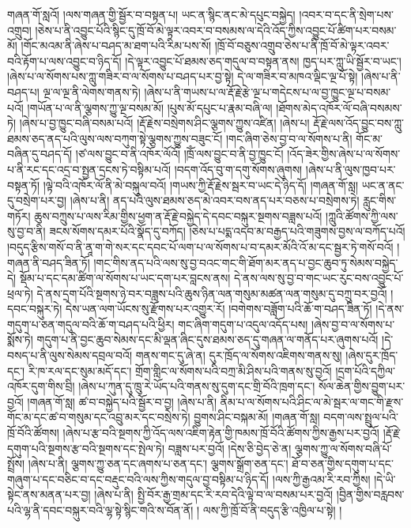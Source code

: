 གཞན་གོ་སླའོ། །ལས་གཞན་གྱི་སྦྱོར་བ་བསྟན་པ། ཡང་ན་སྙིང་ནང་མེ་དཔུང་བསྐྱེད། །འབར་བ་དང་ནི་སྲེག་པས་འགྲུབ། །ཅེས་པ་ནི་འབྱུང་པོའི་སྙིང་དུ་ཁྲོ་བོ་མེ་ལྟར་འབར་བ་བསམས་ལ་དེའི་འོད་ཀྱིས་འབྱུང་པོ་ཚིག་པར་བསམ་མོ། །གོང་མའམ་ནི་ཞེས་པ་བཤད་མ་ཐག་པའི་རིམ་པས་སོ། །ཁྲོ་བོ་བཅུས་འགྲུབ་ཅེས་པ་ནི་ཁྲོ་བོ་མེ་ལྟར་འབར་བའི་རྟོག་པ་ལས་འབྱུང་བ་ཉིད་དོ། །དེ་ལྟར་འབྱུང་པོ་ཐམས་ཅད་གདུལ་བ་བསྟན་ནས། ཁྱད་པར་ཀླུ་ཡི་སྦྱོར་བ་ཡང་། །ཞེས་པ་ལ་སོགས་པས་ཀླུ་གཟིར་བ་ལ་སོགས་པ་བཤད་པར་བྱ་སྟེ། དེ་ལ་གཟིར་བ་མཁའ་ལྡིང་ལྔ་པོ་སྟེ། །ཞེས་པ་ནི་བཤད་པ། ལྔ་ལ་ལྔ་ནི་ལེགས་གནས་ཏེ། །ཞེས་པ་ནི་གཡས་པ་ལ་རྡོ་རྗེ་རྩེ་ལྔ་པ་གདེངས་པ་ལ་བྱ་ཁྱུང་ལྔ་པ་བསམ་པའོ། །གཡོན་པ་ལ་ནི་ལྕགས་ཀྱུ་ལྔ་བསམ་མོ། །པུས་མོ་དཔུང་པ་རྣམ་བཞི་ལ། །ཐོགས་མེད་འཁོར་ལོ་བཞི་བསམས་ཏེ། །ཞེས་པ་བྱ་ཁྱུང་བཞི་བསམ་པའོ། །རྡོ་རྗེས་བསྲེགས་ཤིང་ལྕགས་ཀྱུས་འཛིན། །ཞེས་པ། རྡོ་རྗེ་ལས་འོད་བྱུང་བས་ཀླུ་ཐམས་ཅད་ནད་པའི་ལུས་ལས་བཀུག་སྟེ་ལྕགས་ཀྱུས་བཟུང་ངོ། །གང་ཞིག་ཅེས་བྱ་བ་ལ་སོགས་པ་ནི། གོང་མ་བཞིན་དུ་བཤད་དོ། །ཙ་ལས་བྱུང་བ་ནི་འཁོར་ལོའོ། །ཁྲོཾ་ལས་བྱུང་བ་ནི་བྱ་ཁྱུང་ངོ། །འོད་ཟེར་གྱིས་ཞེས་པ་ལ་སོགས་པ་ནི་རང་དང་འདྲ་བ་སྤྱན་དྲངས་ཏེ་བསྟིམ་པའོ། །བདག་འོད་བུ་ག་དགུ་སོགས་ཞུགས། །ཞེས་པ་ནི་ལུས་ཁྱབ་པར་བསྟན་ཏོ། །ལྟེ་བའི་འཁོར་ལོ་ནི་མེ་བསྐུལ་བའོ། །གཡས་ཀྱི་རྡོ་རྗེས་སྦར་བ་ཡང་དེ་ཉིད་དོ། །གཞན་གོ་སླ། ཡང་ན་ནང་དུ་བསྲེག་པར་བྱ། །ཞེས་པ་ནི། ནད་པའི་ལུས་ཐམས་ཅད་མེ་འབར་བས་ནད་པར་བཅས་པ་བསྲེགས་ཏེ། རླུང་གིས་གཏོར། ཆུས་བཀྲུས་པ་ལས་རིམ་གྱིས་ཕྱག་ན་རྡོ་རྗེ་བསྐྱེད་དེ་དབང་བསྐུར་སྔགས་བཟླས་པའོ། །ཀླུའི་ཚོགས་ཀྱི་ལས་སུ་བྱ་བ་ནི། ཟངས་སོགས་དམར་པོའི་སྣོད་དུ་བཀོད། །ཅེས་པ་པདྨ་འདབ་མ་བརྒྱད་པའི་གཟུགས་བྱས་ལ་བཀོད་པའོ། །བདུད་རྩིས་གསོ་བ་ནི་ནཱ་ག་གེ་སར་དང་དབང་པོ་ལག་པ་ལ་​ སོགས་པ་བ་དམར་མོའི་འོ་མ་དང་སྦྱར་ཏེ་གསོ་བའོ། །གཞན་ནི་བཤད་ཟིན་ཏོ། །གང་གིས་ནད་པའི་ལས་སུ་བྱ་བའང་གང་གི་ཐོག་མར་ནད་པ་བྱང་ཆུབ་ཏུ་སེམས་བསྐྱེད་དེ། སྡོམ་པ་དང་དམ་ཚིག་ལ་སོགས་པ་ཡང་དག་པར་བླངས་ནས། དེ་ནས་ལས་སུ་བྱ་བ་གང་ཡང་རུང་བས་འབྱུང་པོ་ཕྲལ་ཏེ། དེ་ནས་དྲག་པོའི་སྔགས་ཉེ་བར་བཟླས་པའི་ཆུས་ཉིན་ལན་གསུམ་མཚན་ལན་གསུམ་དུ་བཀྲུ་བར་བྱའོ། །དབང་བསྐུར་ཏེ། དེས་ཡན་ལག་ཡོངས་སུ་རྫོགས་པར་འགྱུར་རོ། །བགེགས་བཟློག་པའི་ཆོ་ག་བཤད་ཟིན་ཏོ། །དེ་ནས་གདུག་པ་ཅན་གདུལ་བའི་ཆོ་ག་བཤད་པའི་ཕྱིར། གང་ཞིག་གདུག་པ་འདུལ་འདོད་པས། །ཞེས་བྱ་བ་ལ་སོགས་པ་སྨོས་ཏེ། གདུག་པ་ནི་བྱང་ཆུབ་སེམས་དང་མི་ལྡན་ཞིང་དུས་ཐམས་ཅད་དུ་གཞན་ལ་གནོད་པར་ཞུགས་པའོ། །དེ་བསད་པ་ནི་ལུས་སེམས་དབྲལ་བའོ། གནས་གང་དུ་ཞེ་ན། དུར་ཁྲོད་ལ་སོགས་འཇིགས་གནས་སུ། །ཞེས་དུར་ཁྲོད་དང་། རི་ཁ་རལ་དང་སུམ་མདོ་དང་། གྲོག་གླིང་ལ་སོགས་པའི་བཀྲ་མི་ཤིས་པའི་གནས་སུ་བྱའོ། །དྲག་པོའི་དཀྱིལ་འཁོར་དུག་གིས་བྲི། །ཞེས་པ་ཀུན་དུ་ཁྲུ་རེ་ཡོད་པའི་གནས་སུ་དུག་དང་གྲི་བོའི་ཁྲག་དང་། སོལ་ཆེན་གྱིས་བྱུག་པར་བྱའོ། །གཞན་གོ་སླ། ཚ་བ་བསྐྱེད་པའི་སྦྱོར་བ་བྱ། །ཞེས་པ་ནི། ནིམ་པ་ལ་སོགས་པའི་ཤིང་ལ་མེ་སྦར་ལ་གང་གི་རྫས་གོང་མ་དང་ཚ་བ་གསུམ་དང་འབྲུ་མར་དང་བསྲེས་ཏེ། བྱུགས་ཤིང་བསྐམ་མོ། །གཞན་གོ་སླ། བདག་ལས་སྤྲུལ་པའི་ཁྲོ་བོའི་ཚོགས། །ཞེས་པ་རྩ་བའི་སྔགས་ཀྱི་འོད་ལས་འཇིག་རྟེན་གྱི་ཁམས་ཁྲོ་བོའི་ཚོགས་ཀྱིས་རྒྱས་པར་བྱའོ། །རྡོ་རྗེ་དགུག་པའི་སྔགས་རྩ་བའི་སྔགས་དང་སྤེལ་ཏེ། བཟླས་པར་བྱའོ། །དེས་ཅི་བྱེད་ཅེ་ན། ལྕགས་ཀྱུ་ལ་སོགས་བཞི་པོ་སྤྲོས། །ཞེས་པ་ནི། ལྕགས་ཀྱུ་ཅན་དང་ཞགས་པ་ཅན་དང་། ལྕགས་སྒྲོག་ཅན་དང་། ཐོ་བ་ཅན་གྱིས་དགུག་པ་དང་གཞུག་པ་དང་བཅིང་བ་དང་བརྡུང་བའི་ལས་ཀྱིས་གདུལ་བྱ་བསྟིམ་པ་ཉིད་དོ། །ལས་ཀྱི་རྒྱའམ་རི་རབ་ཀྱིས། །དེ་ཡི་སྟེང་ནས་མནན་པར་བྱ། །ཞེས་པ་ནི། སྤྱི་བོར་རྒྱ་གྲམ་དང་རི་རབ་དེའི་ལྟེ་བ་ལ་བསམ་པར་བྱའོ། །བྱིན་གྱིས་བརླབས་པའི་ལྷ་ནི་དབང་བསྐུར་བའི་ལྷ་སྟེ་སྙིང་གའི་ས་བོན་ནོ། །  ​ ལས་ཀྱི་ཁྲོ་བོ་ནི་བདུད་རྩི་འཁྱིལ་པ་སྟེ། །

